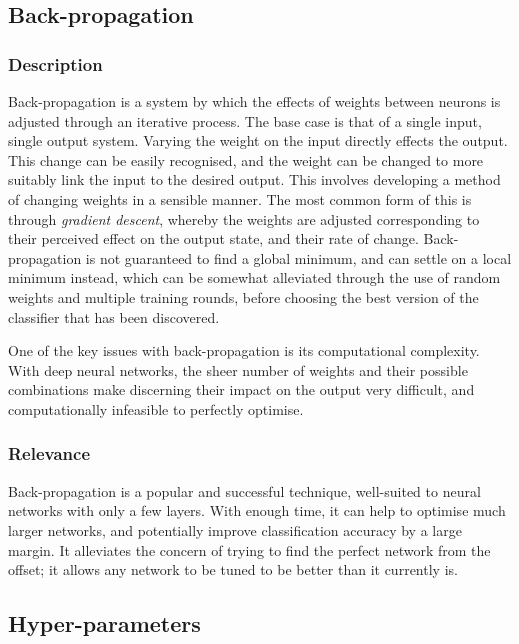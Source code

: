 \subsection{Back-propagation}
\subsubsection{Description}
Back-propagation is a system by which the effects of weights between neurons is adjusted through an iterative process. The base case is that of a single input, single output system. 
Varying the weight on the input directly effects the output. This change can be easily recognised, and the weight can be changed to more suitably link the input to the desired output. This involves developing a method of changing weights in a sensible manner. The most common form of this is through \textit{gradient descent}, whereby the weights are adjusted corresponding to their perceived effect on the output state, and their rate of change. Back-propagation is not guaranteed to find a global minimum, and can settle on a local minimum instead, which can be somewhat alleviated through the use of random weights and multiple training rounds, before choosing the best version of the classifier that has been discovered. 

One of the key issues with back-propagation is its computational complexity. With deep neural networks, the sheer number of weights and their possible combinations make discerning their impact on the output very difficult, and computationally infeasible to perfectly optimise.

\subsubsection{Relevance}
Back-propagation is a popular and successful technique, well-suited to neural networks with only a few layers. With enough time, it can help to optimise much larger networks, and potentially improve classification accuracy by a large margin. It alleviates the concern of trying to find the perfect network from the offset; it allows any network to be tuned to be better than it currently is.


\subsection{Hyper-parameters}
